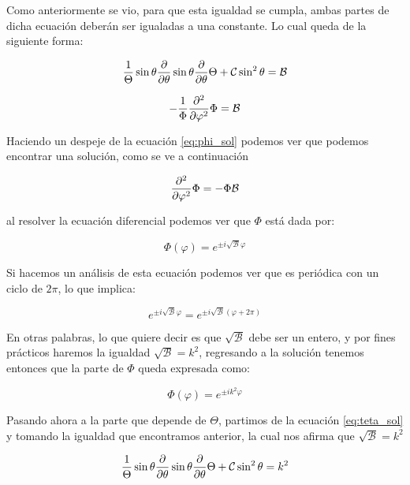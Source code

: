 \documentclass[11pt]{report}
\theoremstyle{plain}
\theoremstyle{definition}
\begin{document}
Como anteriormente se vio, para que esta igualdad se cumpla, ambas partes de dicha ecuación deberán ser igualadas a una constante. Lo cual queda de la siguiente forma:

\begin{equation}
	\label{eq:teta_sol}
	\frac{1}{\Theta}\sin\theta\pdv{\theta}\sin\theta	\pdv{\theta}\Theta+\mathcal{C}\sin^2\theta = \mathcal{B}
\end{equation}

\begin{equation}
	\label{eq:phi_sol}
	- \frac{1}{\Phi}\pdv[2]{\varphi}\Phi = \mathcal{B}
\end{equation}

Haciendo un despeje de la ecuación \ref{eq:phi_sol} podemos ver que podemos encontrar una solución, como se ve a continuación

\begin{equation*}
	\pdv[2]{\varphi}\Phi = -\Phi\mathcal{B}
\end{equation*}

al resolver la ecuación diferencial podemos ver que $\Phi$ está dada por:

\begin{equation*}
	\Phi(\varphi) = e^{\pm i\sqrt{\mathcal{B}}\varphi}
\end{equation*}

Si hacemos un análisis de esta ecuación podemos ver que es periódica con un ciclo de $2\pi$, lo que implica:

\begin{equation*}
	e^{\pm i\sqrt{\mathcal{B}}\varphi} = e^{\pm i\sqrt{\mathcal{B}}(\varphi+2\pi)}
\end{equation*}

En otras palabras, lo que quiere decir es que $\sqrt{\mathcal{B}}$ debe ser un entero, y por fines prácticos haremos la igualdad $\sqrt{\mathcal{B}} = k^2$, regresando a la solución tenemos entonces que la parte de $\Phi$ queda expresada como:

\begin{equation*}
	\Phi(\varphi) = e^{\pm ik^2\varphi}
\end{equation*}


Pasando ahora a la parte que depende de $\Theta$, partimos de la ecuación \ref{eq:teta_sol} y tomando la igualdad que encontramos anterior, la cual nos afirma que $\sqrt{\mathcal{B}} = k^2$

\begin{equation*}
	\frac{1}{\Theta}\sin\theta\pdv{\theta}\sin\theta	\pdv{\theta}\Theta+\mathcal{C}\sin^2\theta = k^2
\end{equation*}
\end{document}
